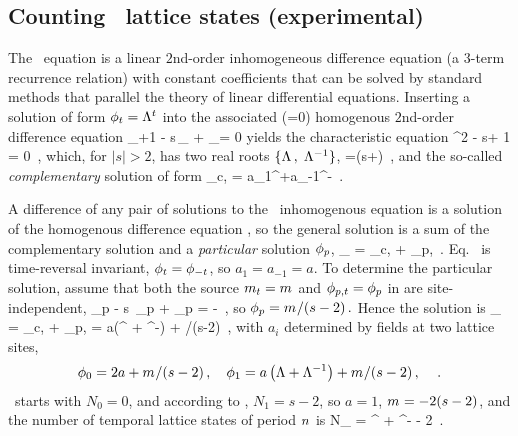 \subsection{Counting \templatt\ lattice states (experimental)}
\label{s:tempCatCountTEMP}

The \templatt\ equation  is
a linear {$2$nd-order inhomogeneous difference} equation
(a $3$-term recurrence relation) with constant coefficients
that can be solved by standard methods that
parallel the theory of linear differential equations.
Inserting a solution of form $\phi_{t}=\Lambda^{t}$ into the
associated (\Ssym{\zeit}=0) homogenous {$2$nd-order difference equation}
\beq
\ssp_{\zeit+1} - {s}\,\ssp_{\zeit} + \ssp_{}= 0
yields the {characteristic equation}
\beq
\ExpaEig^{2} - {s}\ExpaEig + 1 = 0
\,,
which, for $|s|>2$, has two real roots
$\{\ExpaEig\,,\;\ExpaEig^{-1}\}$,
\beq
\ExpaEig
=(s+)
\,,
and the so-called \emph{complementary} solution of form
\beq
\ssp_{c,\zeit}  = a_1\ExpaEig^\zeit+a_{-1}\ExpaEig^{-\zeit}
\,.
\label{PC(2.3.4)}
\eeq

A difference of any pair of solutions to the \templatt\
inhomogenous equation 
is a solution of the homogenous difference equation
, so the general solution is a sum of the
{complementary} solution \refeq{PC(2.3.4)} and a \emph{particular}
solution $\phi_{p}$,
\beq
\ssp_{\zeit} = \ssp_{c,\zeit} + \ssp_{p,\zeit}
\,.
Eq.~ is time-reversal invariant,
$\ssp_{\zeit} = \ssp_{-\zeit}$, so $a_1=a_{-1}=a$.
To determine the particular solution, assume that both the source
 $\Ssym{\zeit}=\Ssym{}$
and $\ssp_{p,\zeit}=\ssp_{p}$
 in  are site-independent,
\beq
\ssp_{p}  -  s \,\ssp_{p} + \ssp_{p}
    = -\Ssym{}
\,,
so
\(
  \ssp_{p} = \Ssym{}/(s-2)
\,.
\)
Hence the solution is
\beq
\ssp_{\zeit} = \ssp_{c,\zeit} + \ssp_{p,\zeit}
= a\left(\ExpaEig^{\zeit} + \ExpaEig^{-\zeit}\right) + {\Ssym{}}/(s-2)
\,,
with $a_i$ determined by fields at two lattice sites,
\[
\ssp_{0}= 2a + {\Ssym{}}/(s-2)
\,,\quad
\ssp_{1}= a\left(\ExpaEig + \ExpaEig^{-1}\right) + {\Ssym{}}/(s-2)
\,,\quad
\,.
\]
\tempLatt\ starts with $N_{0}=0$, and according to ,
$N_{1}=s-2$, so $a=1$, ${m_{}}=-2(s-2)$, and the number
of temporal lattice states of period ${n_{}}$ is
\beq
N_{\cl{}} =
    \ExpaEig^{\cl{}} + \ExpaEig^{-\cl{}} - 2
\,.

